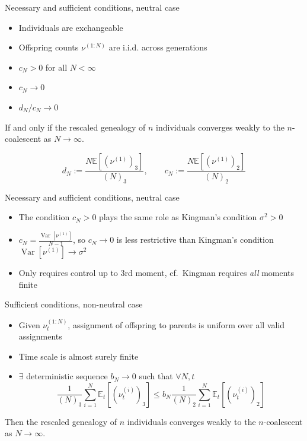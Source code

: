 \documentclass[aspectratio=169]{beamer}
\theoremstyle{definition}
\newcommand{\E}{\mathbb{E}}
\newcommand{\V}{\operatorname{Var}}
\begin{document}
\begin{frame}{Necessary and sufficient conditions, neutral case}
\begin{theorem}
\begin{itemize}
\item Individuals are exchangeable
\item Offspring counts $\nu^{(1:N)}$ are i.i.d. across generations
\item $c_N >0$ for all $N<\infty$
\item $c_N \longrightarrow 0$
\item $d_N/c_N \longrightarrow 0$
\end{itemize}
If and only if the rescaled genealogy of $n$ individuals converges weakly to the $n$-coalescent as $N\to\infty$.
\end{theorem}
\begin{equation*}
d_N := \frac{N \E[ ( \nu^{(1)} )_3 ] }{(N)_3}  ,\qquad
c_N := \frac{N \E[ ( \nu^{(1)} )_2 ] }{(N)_2} 
\end{equation*}
\end{frame}


\begin{frame}{Necessary and sufficient conditions, neutral case}
\begin{itemize}
\item The condition $c_N >0$ plays the same role as Kingman's condition $\sigma^2 >0$
\item $c_N = \frac{\V[\nu^{(1)}]}{N-1}$, so $c_N \to 0$ is less restrictive than Kingman's condition $\V[ \nu^{(1)} ] \to \sigma^2$
\item Only requires control up to 3rd moment, cf.\ Kingman requires \emph{all} moments finite
\end{itemize}
\end{frame}


\begin{frame}{Sufficient conditions, non-neutral case}
\begin{theorem}
\begin{itemize}
\item Given $\nu_t^{(1:N)}$, assignment of offspring to parents is uniform over all valid assignments
\item Time scale is almost surely finite
\item $\exists$ deterministic sequence $b_N \to 0$ such that $\forall N, t$
\begin{equation*}
\frac{1}{(N)_3} \sum_{i=1}^N \E_t[ (\nu_t^{(i)})_3 ]
\leq b_N \frac{1}{(N)_2} \sum_{i=1}^N \E_t[ (\nu_t^{(i)})_2 ]
\end{equation*}
\end{itemize}
Then the rescaled genealogy of $n$ individuals converges weakly to the $n$-coalescent as $N\to\infty$.
\end{theorem}
\end{frame}
\end{document}
